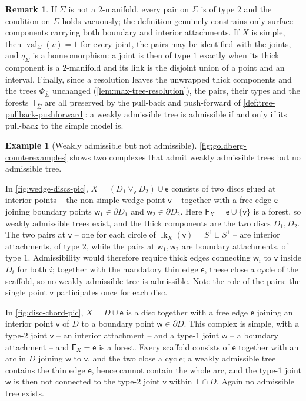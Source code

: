 \documentclass[reqno]{amsart}
\theoremstyle{definition}
\newtheorem{remark}[theorem]{Remark}
\newtheorem{example}[theorem]{Example}
\newcommand\sfF{\mathsf{F}}
\newcommand\sfT{\mathsf{T}}
\newcommand\sfe{\mathsf{e}}
\newcommand\sfv{\mathsf{v}}
\newcommand\sfw{\mathsf{w}}
\renewcommand{\bar}{\overline}
\DeclareMathOperator{\lk}{lk}
\DeclareMathOperator{\val}{val}
\numberwithin{equation}{section}
\begin{document}
\begin{remark}\label{rem:admissible-tree}
If \(\bar{\Sigma}\) is not a \(2\)-manifold, every pair on
\(\Sigma\) is of type \(2\) and the condition on \(\Sigma\)
holds vacuously; the definition genuinely constrains only
surface components carrying both boundary and interior
attachments. If \(X\) is simple, then \(\val_\Sigma(v)=1\) for
every joint, the pairs may be identified with the joints, and
\(q_\Sigma\) is a homeomorphism: a joint is then of type \(1\)
exactly when its thick component is a \(2\)-manifold and its
link is the disjoint union of a point and an interval. Finally,
since a resolution leaves the unwrapped thick components and
the trees \(\Phi_{\bar{\Sigma}}\) unchanged
(\cref{lem:max-tree-resolution}), the pairs, their types and
the forests \(\sfT_{\bar{\Sigma}}\) are all preserved by the
pull-back and push-forward of
\cref{def:tree-pullback-pushforward}: a weakly admissible tree is
admissible if and only if its pull-back to the simple
model is.
\end{remark}

\begin{example}[Weakly admissible but not admissible]
\label{ex:no-admissible-tree}
\cref{fig:goldberg-counterexamples} shows two complexes that
admit weakly admissible trees but no admissible tree.

In \cref{fig:wedge-discs-pic}, \(X=(D_1\vee_\sfv D_2)\cup\sfe\)
consists of two discs glued at interior points -- the non-simple
wedge point \(\sfv\) -- together with a free edge \(\sfe\)
joining boundary points \(\sfw_1\in\partial D_1\) and
\(\sfw_2\in\partial D_2\). Here
\(\sfF_X=\sfe\cup\{\sfv\}\) is a forest, so weakly admissible
trees exist, and the thick components are the two discs
\(D_1,D_2\). The two pairs at \(\sfv\) -- one for each circle of
\(\lk_X(\sfv)=S^1\sqcup S^1\) -- are interior attachments, of
type \(2\), while the pairs at \(\sfw_1,\sfw_2\) are boundary
attachments, of type \(1\). Admissibility would therefore
require thick edges connecting \(\sfw_i\) to \(\sfv\) inside
\(D_i\) for both \(i\); together with the mandatory thin edge
\(\sfe\), these close a cycle of the scaffold, so no weakly
admissible tree is admissible. Note the role of the pairs: the
single point \(\sfv\) participates once for each disc.

In \cref{fig:disc-chord-pic}, \(X=D\cup\sfe\) is a disc together
with a free edge \(\sfe\) joining an interior point \(\sfv\) of
\(D\) to a boundary point \(\sfw\in\partial D\). This complex is
simple, with a type-\(2\) joint \(\sfv\) -- an interior
attachment -- and a type-\(1\) joint \(\sfw\) -- a boundary
attachment -- and \(\sfF_X=\sfe\) is a forest. Every scaffold
consists of \(\sfe\) together with an arc in \(D\) joining
\(\sfw\) to \(\sfv\), and the two close a cycle; a weakly
admissible tree contains the thin edge \(\sfe\), hence cannot
contain the whole arc, and the type-\(1\) joint \(\sfw\) is then
not connected to the type-\(2\) joint \(\sfv\) within
\(\sfT\cap D\). Again no admissible tree exists.
\end{example}
\end{document}
